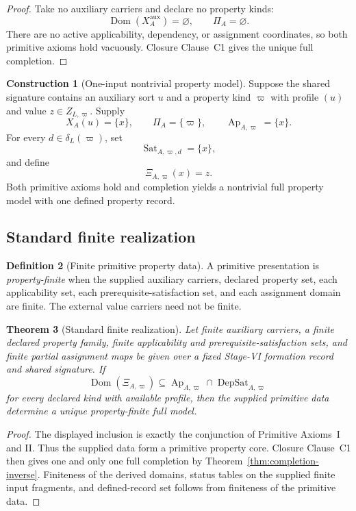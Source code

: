 \documentclass[11pt]{article}
\newcommand{\Ap}{\operatorname{Ap}}
\newcommand{\DepSat}{\operatorname{DepSat}}
\newcommand{\Sat}{\operatorname{Sat}}
\newcommand{\Dom}{\operatorname{Dom}}
\newtheorem{theorem}{Theorem}[section]
\theoremstyle{definition}
\newtheorem{definition}[theorem]{Definition}
\newtheorem{construction}[theorem]{Construction}
\theoremstyle{remark}
\begin{document}
\begin{proof}
Take no auxiliary carriers and declare no property kinds:
\[
\Dom(X_A^{\mathrm{aux}})=\varnothing,
\qquad
\Pi_A=\varnothing.
\]
There are no active applicability, dependency, or assignment coordinates, so both primitive axioms hold vacuously.
Closure Clause~C1 gives the unique full completion.
\end{proof}

\begin{construction}[One-input nontrivial property model]
Suppose the shared signature contains an auxiliary sort \(u\) and a property kind \(\varpi\) with profile \((u)\) and value \(z\in Z_{L,\varpi}\).
Supply
\[
X_A(u)=\{x\},
\qquad
\Pi_A=\{\varpi\},
\qquad
\Ap_{A,\varpi}=\{x\}.
\]
For every \(d\in\delta_L(\varpi)\), set
\[
\Sat_{A,\varpi,d}=\{x\},
\]
and define
\[
\Xi_{A,\varpi}(x)=z.
\]
Both primitive axioms hold and completion yields a nontrivial full property model with one defined property record.
\end{construction}

\subsection{Standard finite realization}

\begin{definition}[Finite primitive property data]
A primitive presentation is \emph{property-finite} when the supplied auxiliary carriers, declared property set, each applicability set, each prerequisite-satisfaction set, and each assignment domain are finite.
The external value carriers need not be finite.
\end{definition}

\begin{theorem}[Standard finite realization]
\label{thm:finite-realization}
Let finite auxiliary carriers, a finite declared property family, finite applicability and prerequisite-satisfaction sets, and finite partial assignment maps be given over a fixed Stage-VI formation record and shared signature.
If
\[
\Dom(\Xi_{A,\varpi})
\subseteq
\Ap_{A,\varpi}\cap\DepSat_{A,\varpi}
\]
for every declared kind with available profile, then the supplied primitive data determine a unique property-finite full model.
\end{theorem}

\begin{proof}
The displayed inclusion is exactly the conjunction of Primitive Axioms~I and II.
Thus the supplied data form a primitive property core.
Closure Clause~C1 then gives one and only one full completion by Theorem~\ref{thm:completion-inverse}.
Finiteness of the derived domains, status tables on the supplied finite input fragments, and defined-record set follows from finiteness of the primitive data.
\end{proof}
\end{document}
